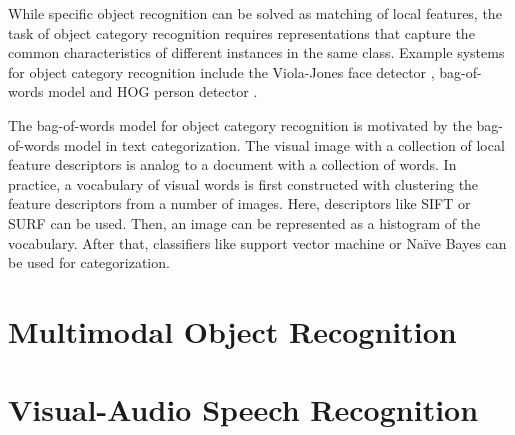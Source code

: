 While specific object recognition can be solved as matching of local features, the task of object category recognition requires representations that capture the common characteristics of different instances in the same class. Example systems for object category recognition include the Viola-Jones face detector \cite{viola_rapid_2001}, bag-of-words model \cite{csurka_visual_2004} and HOG person detector \cite{dalal_histograms_2005}. 

The bag-of-words model \cite{csurka_visual_2004} for object category recognition is motivated by the bag-of-words model in text categorization. The visual image with a collection of local feature descriptors is analog to a document with a collection of words. In practice, a vocabulary of visual words is first constructed with clustering the feature descriptors from a number of images. Here, descriptors like SIFT or SURF can be used. Then, an image can be represented as a histogram of the vocabulary. After that, classifiers like support vector machine or Na\"ive Bayes can be used for categorization.

\section{Multimodal Object Recognition}

\section{Visual-Audio Speech Recognition}

